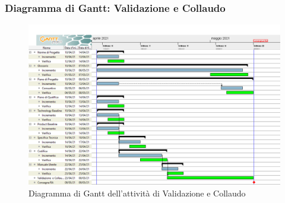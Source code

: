 \newpage
\subsubsection{Diagramma di Gantt: Validazione e Collaudo}
\begin{figure}[ht]
    \centering
    \includegraphics[width=\textwidth]{Immagini/GanttValidazioneECollaudo}
    \caption{Diagramma di Gantt dell'attività di Validazione e Collaudo}
\end{figure}
